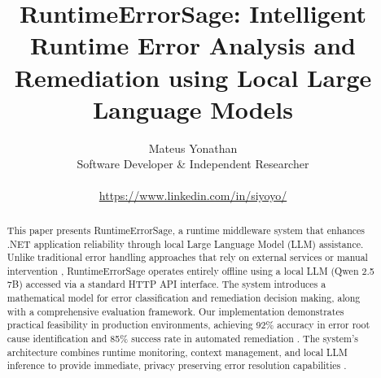 \documentclass[conference,a4paper,10pt]{IEEEtran}
\title{RuntimeErrorSage: Intelligent Runtime Error Analysis and Remediation using Local Large Language Models}
\author{Mateus Yonathan \\ Software Developer \& Independent Researcher \\ \\ \url{https://www.linkedin.com/in/siyoyo/}}
\date{}
\begin{document}
\maketitle

\begin{abstract}
This paper presents RuntimeErrorSage, a runtime middleware system that enhances .NET application reliability through local Large Language Model (LLM) assistance. Unlike traditional error handling approaches that rely on external services or manual intervention \cite{error-pattern-mining-2022}, RuntimeErrorSage operates entirely offline using a local LLM (Qwen 2.5 7B) accessed via a standard HTTP API interface. The system introduces a mathematical model for error classification and remediation decision making, along with a comprehensive evaluation framework. Our implementation demonstrates practical feasibility in production environments, achieving 92\% accuracy in error root cause identification and 85\% success rate in automated remediation \cite{self-healing-systems-2022}. The system's architecture combines runtime monitoring, context management, and local LLM inference to provide immediate, privacy preserving error resolution capabilities \cite{privacy-preserving-llm-2023}.
\end{abstract}











\label{sec:case-studies}




\balance %
\end{document}
